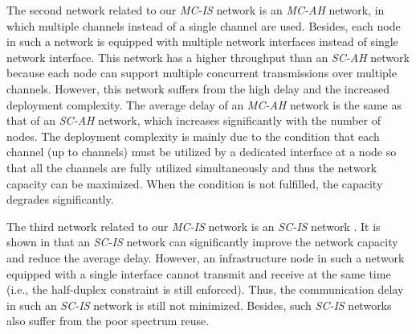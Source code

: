 \documentclass[10pt,journal]{IEEEtran}
\begin{document}
The second network related to our \textit{MC-IS} network is an \textit{MC-AH} network, in which multiple channels instead of a single channel are used. Besides, each node in such a network is equipped with multiple network interfaces instead of single network interface. This network has a higher throughput than an \textit{SC-AH} network because each node can support multiple concurrent transmissions over multiple channels. However, this network suffers from the high delay and the increased deployment complexity. The average delay of an \textit{MC-AH} network is the same as that of an \textit{SC-AH} network, which increases significantly with the number of nodes. The deployment complexity is mainly due to the condition \cite{Kyasanur:mobicom2005} that each channel (up to  channels) must be utilized by a dedicated interface at a node so that all the channels are fully utilized simultaneously and thus the network capacity can be maximized. When the condition is not fulfilled, the capacity degrades significantly.

The third network related to our \textit{MC-IS} network is an \textit{SC-IS} network \cite{bliu:infocom2003,Kozat:mobicom2003,Zemlianov:jsac05,bliu:mobihoc2007,panli:jsac09,XWang:TC2010,panli:infocom10,Devu:INFOCOM2011,Xie:ICC12}. It is shown in \cite{bliu:infocom2003,panli:jsac09} that an \textit{SC-IS} network can significantly improve the network capacity and reduce the average delay. However, an infrastructure node in such a network equipped with a single interface cannot transmit and receive at the same time (i.e., the half-duplex constraint is still enforced). Thus, the communication delay in such an \textit{SC-IS} network is still not minimized. Besides, such \textit{SC-IS} networks also suffer from the poor spectrum reuse.
\end{document}
